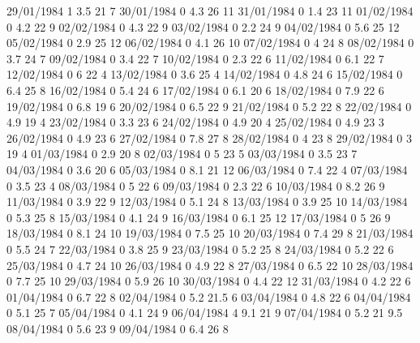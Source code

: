 29/01/1984  1      3.5    21     7 
30/01/1984  0      4.3    26     11 
31/01/1984  0      1.4    23     11 
01/02/1984  0      4.2    22     9 
02/02/1984  0      4.3    22     9 
03/02/1984  0      2.2    24     9 
04/02/1984  0      5.6    25     12 
05/02/1984  0      2.9    25     12 
06/02/1984  0      4.1    26     10 
07/02/1984  0      4      24     8 
08/02/1984  0      3.7    24     7 
09/02/1984  0      3.4    22     7 
10/02/1984  0      2.3    22     6 
11/02/1984  0      6.1    22     7 
12/02/1984  0      6      22     4 
13/02/1984  0      3.6    25     4 
14/02/1984  0      4.8    24     6 
15/02/1984  0      6.4    25     8 
16/02/1984  0      5.4    24     6 
17/02/1984  0      6.1    20     6 
18/02/1984  0      7.9    22     6 
19/02/1984  0      6.8    19     6 
20/02/1984  0      6.5    22     9 
21/02/1984  0      5.2    22     8 
22/02/1984  0      4.9    19     4 
23/02/1984  0      3.3    23     6 
24/02/1984  0      4.9    20     4 
25/02/1984  0      4.9    23     3 
26/02/1984  0      4.9    23     6 
27/02/1984  0      7.8    27     8 
28/02/1984  0      4      23     8 
29/02/1984  0      3      19     4 
01/03/1984  0      2.9    20     8 
02/03/1984  0      5      23     5 
03/03/1984  0      3.5    23     7 
04/03/1984  0      3.6    20     6 
05/03/1984  0      8.1    21     12 
06/03/1984  0      7.4    22     4 
07/03/1984  0      3.5    23     4 
08/03/1984  0      5      22     6 
09/03/1984  0      2.3    22     6 
10/03/1984  0      8.2    26     9 
11/03/1984  0      3.9    22     9 
12/03/1984  0      5.1    24     8 
13/03/1984  0      3.9    25     10 
14/03/1984  0      5.3    25     8 
15/03/1984  0      4.1    24     9 
16/03/1984  0      6.1    25     12 
17/03/1984  0      5      26     9 
18/03/1984  0      8.1    24     10 
19/03/1984  0      7.5    25     10 
20/03/1984  0      7.4    29     8 
21/03/1984  0      5.5    24     7 
22/03/1984  0      3.8    25     9 
23/03/1984  0      5.2    25     8 
24/03/1984  0      5.2    22     6 
25/03/1984  0      4.7    24     10 
26/03/1984  0      4.9    22     8 
27/03/1984  0      6.5    22     10 
28/03/1984  0      7.7    25     10 
29/03/1984  0      5.9    26     10 
30/03/1984  0      4.4    22     12 
31/03/1984  0      4.2    22     6 
01/04/1984  0      6.7    22     8 
02/04/1984  0      5.2    21.5   6 
03/04/1984  0      4.8    22     6 
04/04/1984  0      5.1    25     7 
05/04/1984  0      4.1    24     9 
06/04/1984  4      9.1    21     9 
07/04/1984  0      5.2    21     9.5 
08/04/1984  0      5.6    23     9 
09/04/1984  0      6.4    26     8 

